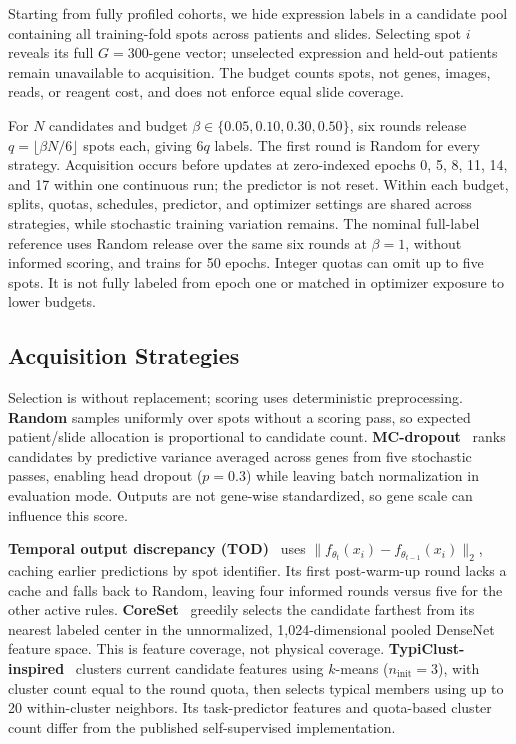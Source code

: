 Starting from fully profiled cohorts, we hide expression labels in a candidate pool containing all training-fold spots across patients and slides. Selecting spot $i$ reveals its full $G=300$-gene vector; unselected expression and held-out patients remain unavailable to acquisition. The budget counts spots, not genes, images, reads, or reagent cost, and does not enforce equal slide coverage.

For $N$ candidates and budget $\beta\in\{0.05,0.10,0.30,0.50\}$, six rounds release $q=\lfloor\beta N/6\rfloor$ spots each, giving $6q$ labels. The first round is Random for every strategy. Acquisition occurs before updates at zero-indexed epochs 0, 5, 8, 11, 14, and 17 within one continuous run; the predictor is not reset. Within each budget, splits, quotas, schedules, predictor, and optimizer settings are shared across strategies, while stochastic training variation remains. The nominal full-label reference uses Random release over the same six rounds at $\beta=1$, without informed scoring, and trains for 50 epochs. Integer quotas can omit up to five spots. It is not fully labeled from epoch one or matched in optimizer exposure to lower budgets.

\subsection{Acquisition Strategies}
\label{sec:strategies}

Selection is without replacement; scoring uses deterministic preprocessing. \textbf{Random} samples uniformly over spots without a scoring pass, so expected patient/slide allocation is proportional to candidate count. \textbf{MC-dropout}~\cite{gal2016dropout} ranks candidates by predictive variance averaged across genes from five stochastic passes, enabling head dropout ($p=0.3$) while leaving batch normalization in evaluation mode. Outputs are not gene-wise standardized, so gene scale can influence this score.

\textbf{Temporal output discrepancy (TOD)}~\cite{huang2021semi} uses $\|f_{\theta_t}(x_i)-f_{\theta_{t-1}}(x_i)\|_2$, caching earlier predictions by spot identifier. Its first post-warm-up round lacks a cache and falls back to Random, leaving four informed rounds versus five for the other active rules. \textbf{CoreSet}~\cite{sener2018active} greedily selects the candidate farthest from its nearest labeled center in the unnormalized, 1,024-dimensional pooled DenseNet feature space. This is feature coverage, not physical coverage. \textbf{TypiClust-inspired}~\cite{hacohen2022active} clusters current candidate features using $k$-means ($n_{\mathrm{init}}=3$), with cluster count equal to the round quota, then selects typical members using up to 20 within-cluster neighbors. Its task-predictor features and quota-based cluster count differ from the published self-supervised implementation.


